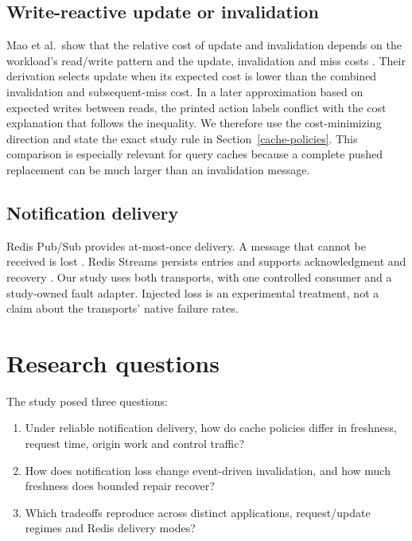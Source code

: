 \documentclass[pdflatex,sn-mathphys-num]{sn-jnl}
\providecommand{\tightlist}{\setlength{\itemsep}{0pt}\setlength{\parskip}{0pt}}
\begin{document}
\subsection{Write-reactive update or invalidation}\label{write-reactive-update-or-invalidation}

Mao et al.~show that the relative cost of update and invalidation depends on the workload's read/write pattern and the update, invalidation and miss costs \citep{mao2024cachefreshness}. Their derivation selects update when its expected cost is lower than the combined invalidation and subsequent-miss cost. In a later approximation based on expected writes between reads, the printed action labels conflict with the cost explanation that follows the inequality. We therefore use the cost-minimizing direction and state the exact study rule in Section~\ref{cache-policies}. This comparison is especially relevant for query caches because a complete pushed replacement can be much larger than an invalidation message.

\subsection{Notification delivery}\label{notification-delivery}

Redis Pub/Sub provides at-most-once delivery. A message that cannot be received is lost \citep{redisPubSubDocs}. Redis Streams persists entries and supports acknowledgment and recovery \citep{redisStreamsDocs}. Our study uses both transports, with one controlled consumer and a study-owned fault adapter. Injected loss is an experimental treatment, not a claim about the transports' native failure rates.

\section{Research questions}\label{research-questions}

The study posed three questions:

\begin{enumerate}
\def\labelenumi{\arabic{enumi}.}
\tightlist
\item
  Under reliable notification delivery, how do cache policies differ in freshness, request time, origin work and control traffic?
\item
  How does notification loss change event-driven invalidation, and how much freshness does bounded repair recover?
\item
  Which tradeoffs reproduce across distinct applications, request/update regimes and Redis delivery modes?
\end{enumerate}
\end{document}
